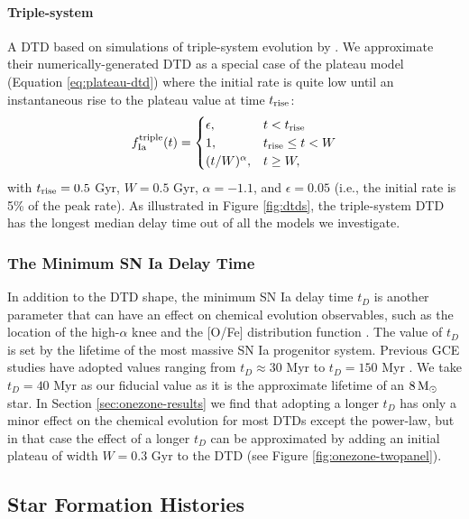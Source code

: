 \documentclass[twocolumn,twocolappendix,linenumbers]{aastex631}
\begin{document}
\paragraph{Triple-system} A DTD based on simulations of triple-system evolution by \citet{Rajamuthukumar2023-TripleEvolution}. We approximate their numerically-generated DTD as a special case of the plateau model (Equation \ref{eq:plateau-dtd}) where the initial rate is quite low until an instantaneous rise to the plateau value at time $t_{\rm rise}$:
\begin{equation}
    f_{\rm Ia}^{\rm triple}(t) =
    \begin{cases}
        \epsilon, & t < t_{\rm rise} \\
        1, & t_{\rm rise} \leq t < W \\
        (t / W) ^ \alpha, & t \geq W,
    \end{cases}
    \label{eq:triple-dtd}
\end{equation}
with $t_{\rm rise}=0.5$ Gyr, $W=0.5$ Gyr, $\alpha=-1.1$, and $\epsilon=0.05$ (i.e., the initial rate is 5\% of the peak rate). As illustrated in Figure \ref{fig:dtds}, the triple-system DTD has the longest median delay time out of all the models we investigate.

\subsubsection{The Minimum SN Ia Delay Time}
\label{sec:minimum-delay}

In addition to the DTD shape, the minimum SN Ia delay time $t_D$ is another parameter that can have an effect on chemical evolution observables, such as the location of the high-$\alpha$ knee and the [O/Fe] distribution function \citep[DF;][]{Andrews2017-ChemicalEvolution}. The value of $t_D$ is set by the lifetime of the most massive SN Ia progenitor system. Previous GCE studies have adopted values ranging from $t_D\approx30$ Myr \citep[e.g.,][]{Poulhazan2018-PrecisionPollution} to $t_D=150$ Myr . We take $t_D=40$ Myr as our fiducial value as it is the approximate lifetime of an $8\,{\rm M}_\odot$ star. In Section \ref{sec:onezone-results} we find that adopting a longer $t_D$ has only a minor effect on the chemical evolution for most DTDs except the power-law, but in that case the effect of a longer $t_D$ can be approximated by adding an initial plateau of width $W=0.3$ Gyr to the DTD (see Figure \ref{fig:onezone-twopanel}).

\subsection{Star Formation Histories}
\label{sec:sfh}
\end{document}
